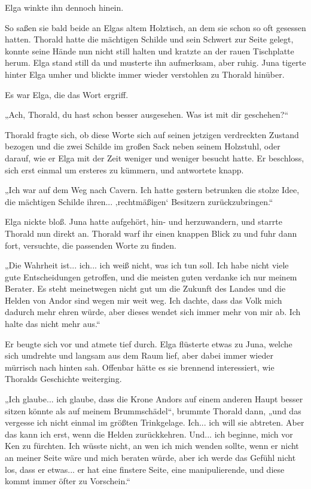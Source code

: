 Elga winkte ihn dennoch hinein.



\trennzeichen



So saßen sie bald beide an Elgas altem Holztisch, an dem sie schon so oft gesessen hatten. Thorald hatte die mächtigen Schilde und sein Schwert zur Seite gelegt, konnte seine Hände nun nicht still halten und kratzte an der rauen Tischplatte herum. Elga stand still da und musterte ihn aufmerksam, aber ruhig. Juna tigerte hinter Elga umher und blickte immer wieder verstohlen zu Thorald hinüber.

Es war Elga, die das Wort ergriff.

„Ach, Thorald, du hast schon besser ausgesehen. Was ist mit dir geschehen?“

Thorald fragte sich, ob diese Worte sich auf seinen jetzigen verdreckten Zustand bezogen und die zwei Schilde im großen Sack neben seinem Holzstuhl, oder darauf, wie er Elga mit der Zeit weniger und weniger besucht hatte. Er beschloss, sich erst einmal um ersteres zu kümmern, und antwortete knapp.

„Ich war auf dem Weg nach Cavern. Ich hatte gestern betrunken die stolze Idee, die mächtigen Schilde ihren... ‚rechtmäßigen‘ Besitzern zurückzubringen.“

Elga nickte bloß. Juna hatte aufgehört, hin- und herzuwandern, und starrte Thorald nun direkt an. Thorald warf ihr einen knappen Blick zu und fuhr dann fort, versuchte, die passenden Worte zu finden.

„Die Wahrheit ist... ich... ich weiß nicht, was ich tun soll. Ich habe nicht viele gute Entscheidungen getroffen, und die meisten guten verdanke ich nur meinem Berater. Es steht meinetwegen nicht gut um die Zukunft des Landes und die Helden von Andor sind wegen mir weit weg. Ich dachte, dass das Volk mich dadurch mehr ehren würde, aber dieses wendet sich immer mehr von mir ab. Ich halte das nicht mehr aus.“

Er beugte sich vor und atmete tief durch. Elga flüsterte etwas zu Juna, welche sich umdrehte und langsam aus dem Raum lief, aber dabei immer wieder mürrisch nach hinten sah. Offenbar hätte es sie brennend interessiert, wie Thoralds Geschichte weiterging.

„Ich glaube... ich glaube, dass die Krone Andors auf einem anderen Haupt besser sitzen könnte als auf meinem Brummschädel“, brummte Thorald dann, „und das vergesse ich nicht einmal im größten Trinkgelage. Ich... ich will sie abtreten. Aber das kann ich erst, wenn die Helden zurückkehren. Und... ich beginne, mich vor Ken zu fürchten. Ich wüsste nicht, an wen ich mich wenden sollte, wenn er nicht an meiner Seite wäre und mich beraten würde, aber ich werde das Gefühl nicht los, dass er etwas... er hat eine finstere Seite, eine manipulierende, und diese kommt immer öfter zu Vorschein.“

